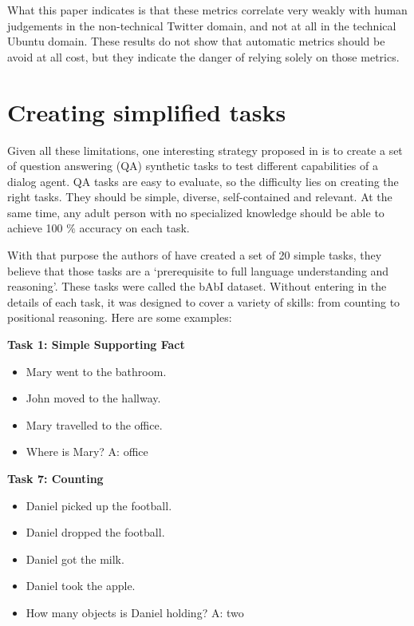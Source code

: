 What this paper indicates is that these metrics correlate very weakly with human judgements in the non-technical Twitter domain, and not at all in the technical Ubuntu domain. These results do not show that automatic metrics should be avoid at all cost, but they indicate the danger of relying solely on those metrics.

\section{Creating simplified tasks}
\label{ch:03-tasks}

Given all these limitations, one interesting strategy proposed in \cite{WestonBCM15} is to create a set of question answering (QA) synthetic tasks to test different capabilities of a dialog agent. QA tasks are easy to evaluate, so the difficulty lies on creating the right tasks. They should be simple, diverse, self-contained and relevant. At the same time, any adult person with no specialized knowledge should be able to achieve 100 $\%$ accuracy on each task.

With that purpose the authors of \cite{WestonBCM15} have created a set of 20 simple tasks, they believe that those tasks are a `prerequisite to full language understanding and reasoning'. These tasks were called the bAbI dataset. Without entering in the details of each task, it was designed to cover a variety of skills: from counting to positional reasoning. Here are some examples:

\textbf{Task 1: Simple Supporting Fact} 
\begin{itemize} 
\item[] Mary went to the bathroom.
\item[] John moved to the hallway.
\item[] Mary travelled to the office.
\item[] Where is Mary? A: office
\end{itemize}

\vspace{0.3cm}

\textbf{Task 7: Counting}
\begin{itemize} 
\item[] Daniel picked up the football.
\item[] Daniel dropped the football.
\item[] Daniel got the milk.
\item[] Daniel took the apple.
\item[] How many objects is Daniel holding? A: two
\end{itemize} 


